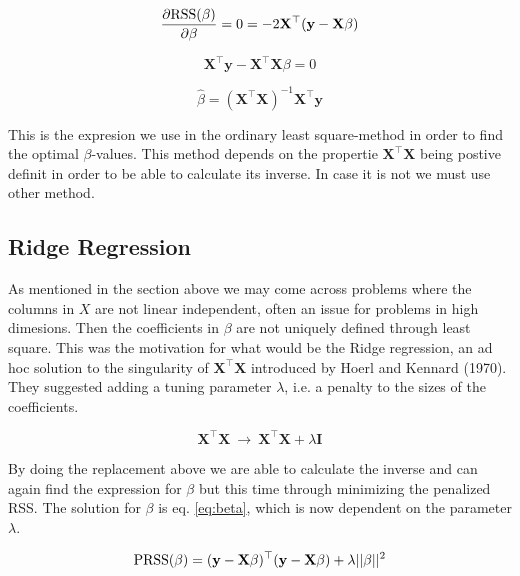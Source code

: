 \documentclass[a4paper,12pt, english]{article}
\begin{document}
\begin{equation}
\frac{\partial \textnormal{RSS}(\beta)}{\partial \beta} = 0 = -2 \mathbf{X}^{\top}(\mathbf{y} - \mathbf{X}\beta)
\end{equation}

\begin{equation}
\mathbf{X}^{\top}\mathbf{y} - \mathbf{X}^{\top}\mathbf{X} \beta = 0
\end{equation}

\begin{equation}
\hat{\beta} = (\mathbf{X}^{\top}\mathbf{X})^{-1}\mathbf{X}^{\top}\mathbf{y}
\end{equation}

This is the expresion we use in the ordinary least square-method in order to find the optimal $\beta$-values. This method depends on the propertie $\mathbf{X^{\top}}\mathbf{X}$ being postive definit in order to be able to calculate its inverse. In case it is not we must use other method.

\subsection*{Ridge Regression}

As mentioned in the section above we may come across problems where the columns in $X$ are not linear independent, often an issue for problems in high dimesions. Then the coefficients in $\beta$ are not uniquely defined through least square. This was the motivation for what would be the Ridge regression, an ad hoc solution to the singularity of $\mathbf{X^{\top}}\mathbf{X}$ introduced by Hoerl and Kennard (1970).
They suggested adding a tuning parameter $\lambda$, i.e. a penalty to the sizes of the coefficients.

\begin{equation}
\mathbf{X}^{\top}\mathbf{X} \ \rightarrow \ \mathbf{X}^{\top}\mathbf{X} + \lambda\mathbf{I}
\end{equation}

By doing the replacement above we are able to calculate the inverse and can again find the expression for $\beta$ but this time through minimizing the penalized RSS. The solution for $\beta$ is eq. \ref{eq:beta}, which is now dependent on the parameter $\lambda$.

\begin{equation}
\textnormal{PRSS}(\beta) = (\mathbf{y} - \mathbf{X}\beta)^{\top}(\mathbf{y} - \mathbf{X}\beta) + \lambda ||\beta||^2
\end{equation}
\end{document}
